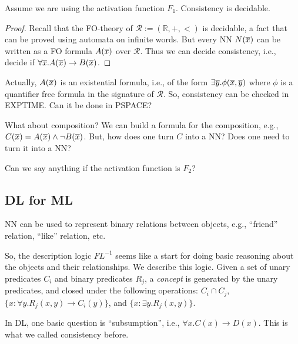 \documentclass[a4paper,10pt]{article}
\begin{document}
\begin{theorem}
Assume we are using the activation function $F_1$. Consistency is decidable. 
\end{theorem}

\begin{proof}
Recall that the FO-theory of $\mathcal{R} := (\mathbb{R},+,<)$ is decidable, a fact that can be proved using automata on infinite words. 
But every NN $N(\overline{x})$ can be written as a FO formula $A(\overline{x})$ over $\mathcal{R}$. Thus we can decide consistency, i.e., decide if $\forall \overline{x}. A(\overline{x}) \to B(\overline{x})$. 
\end{proof}

Actually, $A(\overline{x})$ is an existential formula, i.e., of the form $\exists \overline{y}. \phi(\overline{x},\overline{y})$ where $\phi$ is a quantifier free formula in the signature of $\mathcal{R}$. So, consistency can be checked in EXPTIME. Can it be done in PSPACE?

What about composition? We can build a formula for the composition, e.g., $C(\overline{x}) = A(\overline{x}) \wedge \neg B(\overline{x})$. But, how does one turn $C$ into a NN? Does one need to turn it into a NN?
 
Can we say anything if the activation function is $F_2$?

\subsection{DL for ML}

NN can be used to represent binary relations between objects, e.g., ``friend'' relation, ``like'' relation, etc. 

So, the description logic $FL^{-1}$ seems like a start for doing basic reasoning about the objects and their relationships. We describe this logic. Given a set of unary predicates $C_i$ and binary predicates $R_j$, a \emph{concept} is generated by the unary predicates, and closed under the following operations: $C_i \cap C_j$, 
$\{x : \forall y. R_j(x,y) \to C_i(y)\}$, and $\{x : \exists y. R_j(x,y)\}$.

In DL, one basic question is ``subsumption'', i.e., $\forall x. C(x) \to D(x)$. This is what we called consistency before.
\end{document}
